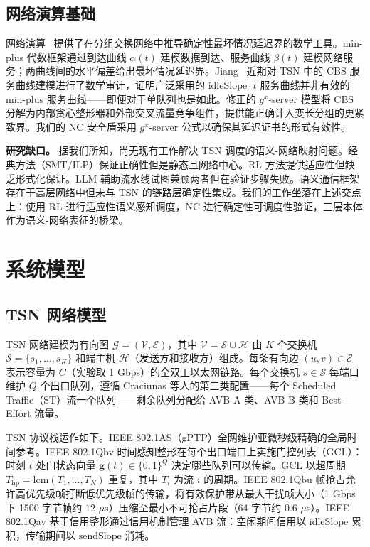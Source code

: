 \documentclass[UTF8]{ctexart}
\begin{document}
\subsection{网络演算基础}

网络演算~\cite{jiang2024ncrevisit} 提供了在分组交换网络中推导确定性最坏情况延迟界的数学工具。min-plus 代数框架通过到达曲线 $\alpha(t)$ 建模数据到达、服务曲线 $\beta(t)$ 建模网络服务；两曲线间的水平偏差给出最坏情况延迟界。Jiang~\cite{jiang2024ncrevisit} 近期对 TSN 中的 CBS 服务曲线建模进行了数学审计，证明广泛采用的 $\text{idleSlope}\cdot t$ 服务曲线并非有效的 min-plus 服务曲线——即便对于单队列也是如此。修正的 $g^x$-server 模型将 CBS 分解为内部贪心整形器和外部交叉流量竞争组件，提供能正确计入变长分组的更紧致界。我们的 NC 安全盾采用 $g^x$-server 公式以确保其延迟证书的形式有效性。

\textbf{研究缺口。} 据我们所知，尚无现有工作解决 TSN 调度的语义-网络映射问题。经典方法（SMT/ILP）保证正确性但是静态且网络中心。RL 方法提供适应性但缺乏形式化保证。LLM 辅助流水线试图兼顾两者但在验证步骤失败。语义通信框架存在于高层网络中但未与 TSN 的链路层确定性集成。我们的工作坐落在上述交点上：使用 RL 进行适应性语义感知调度，NC 进行确定性可调度性验证，三层本体作为语义-网络表征的桥梁。

\section{系统模型}

\subsection{TSN 网络模型}

TSN 网络建模为有向图 $\mathcal{G} = (\mathcal{V}, \mathcal{E})$，其中 $\mathcal{V} = \mathcal{S} \cup \mathcal{H}$ 由 $K$ 个交换机 $\mathcal{S} = \{s_1, \ldots, s_K\}$ 和端主机 $\mathcal{H}$（发送方和接收方）组成。每条有向边 $(u,v) \in \mathcal{E}$ 表示容量为 $C$（实验取 1 Gbps）的全双工以太网链路。每个交换机 $s \in \mathcal{S}$ 每端口维护 $Q$ 个出口队列，遵循 Craciunas 等人的第三类配置——每个 Scheduled Traffic（ST）流一个队列——剩余队列分配给 AVB A 类、AVB B 类和 Best-Effort 流量。

TSN 协议栈运作如下。IEEE 802.1AS（gPTP）全网维护亚微秒级精确的全局时间参考。IEEE 802.1Qbv 时间感知整形在每个出口端口上实施门控列表（GCL）：时刻 $t$ 处门状态向量 $\mathbf{g}(t) \in \{0,1\}^Q$ 决定哪些队列可以传输。GCL 以超周期 $T_{\text{hp}} = \text{lcm}(T_1, \ldots, T_N)$ 重复，其中 $T_i$ 为流 $i$ 的周期。IEEE 802.1Qbu 帧抢占允许高优先级帧打断低优先级帧的传输，将有效保护带从最大干扰帧大小（1 Gbps 下 1500 字节帧约 12 $\mu$s）压缩至最小不可抢占片段（64 字节约 0.6 $\mu$s）。IEEE 802.1Qav 基于信用整形通过信用机制管理 AVB 流：空闲期间信用以 $\text{idleSlope}$ 累积，传输期间以 $\text{sendSlope}$ 消耗。
\end{document}
